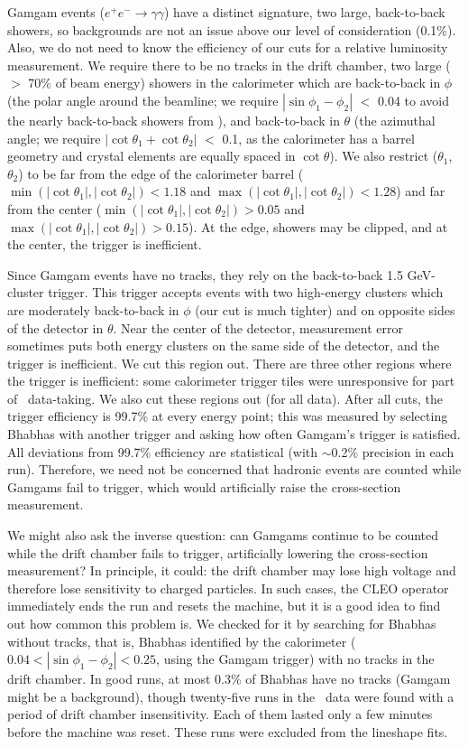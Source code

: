 \documentclass[aps,prd,preprint,superscriptaddress,tightenlines,nofootinbib,floatfix]{revtex4}
\begin{document}
Gamgam events ($e^+e^- \to \gamma\gamma$) have a distinct signature,
two large, back-to-back showers, so backgrounds are not an issue above
our level of consideration (0.1\%).  Also, we do not need to know the
efficiency of our cuts for a relative luminosity measurement.  We
require there to be no tracks in the drift chamber, two large ($>$
70\% of beam energy) showers in the calorimeter which are back-to-back
in $\phi$ (the polar angle around the beamline; we require $|\sin
\phi_1 - \phi_2|$ $<$ 0.04 to avoid the nearly back-to-back showers
from \ee), and back-to-back in $\theta$ (the azimuthal angle; we
require $|\cot\theta_1 + \cot\theta_2|$ $<$ 0.1, as the calorimeter
has a barrel geometry and crystal elements are equally spaced in
$\cot\theta$).  We also restrict ($\theta_1$, $\theta_2$) to be far
from the edge of the calorimeter barrel ($\min(|\cot\theta_1|,
|\cot\theta_2|) < 1.18$ and $\max(|\cot\theta_1|, |\cot\theta_2|) <
1.28$) and far from the center ($\min(|\cot\theta_1|, |\cot\theta_2|)
> 0.05$ and $\max(|\cot\theta_1|, |\cot\theta_2|) > 0.15$).  At the
edge, showers may be clipped, and at the center, the trigger is
inefficient.

Since Gamgam events have no tracks, they rely on the back-to-back 1.5
GeV-cluster trigger.  This trigger accepts events with two high-energy
clusters which are moderately back-to-back in $\phi$ (our cut is much
tighter) and on opposite sides of the detector in $\theta$.  Near the
center of the detector, measurement error sometimes puts both energy
clusters on the same side of the detector, and the trigger is
inefficient.  We cut this region out.  There are three other regions
where the trigger is inefficient: some calorimeter trigger tiles were
unresponsive for part of \ups\ data-taking.  We also cut these regions
out (for all data).  After all cuts, the trigger efficiency is 99.7\%
at every energy point; this was measured by selecting Bhabhas with
another trigger and asking how often Gamgam's trigger is satisfied.
All deviations from 99.7\% efficiency are statistical (with
$\sim$0.2\% precision in each run).  Therefore, we need not be
concerned that hadronic events are counted while Gamgams fail to
trigger, which would artificially raise the cross-section measurement.

We might also ask the inverse question: can Gamgams continue to be
counted while the drift chamber fails to trigger, artificially
lowering the cross-section measurement?  In principle, it could: the
drift chamber may lose high voltage and therefore lose sensitivity to
charged particles.  In such cases, the CLEO operator immediately ends
the run and resets the machine, but it is a good idea to find out how
common this problem is.  We checked for it by searching for Bhabhas
without tracks, that is, Bhabhas identified by the calorimeter ($0.04
< |\sin \phi_1 - \phi_2| < 0.25$, using the Gamgam trigger) with no
tracks in the drift chamber.  In good runs, at most 0.3\% of Bhabhas
have no tracks (Gamgam might be a background), though twenty-five runs
in the \ups\ data were found with a period of drift chamber
insensitivity.  Each of them lasted only a few minutes before the
machine was reset.  These runs were excluded from the lineshape fits.
\end{document}
